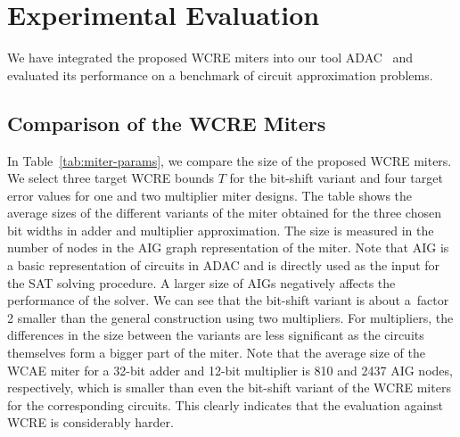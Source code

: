 \documentclass[runningheads]{llncs}
\begin{document}


\section{Experimental Evaluation}

We have integrated the proposed WCRE miters into our tool ADAC~\cite{ADAC} and
evaluated its performance on a benchmark of  circuit approximation problems.

\subsection{Comparison of the WCRE Miters}
%
In Table~\ref{tab:miter-params},  we compare the size of the proposed WCRE
miters. We select three target WCRE bounds $T$ for the bit-shift variant and
four target error values for one and two multiplier miter designs. The table
shows the average sizes of the different variants of the miter obtained for the
three chosen bit widths in adder and multiplier approximation. The size is
measured in the number of nodes in the AIG graph representation of the miter.
Note that AIG is a basic representation of circuits in ADAC and is directly used
as the input for the SAT solving procedure. A larger size of AIGs negatively
affects the performance of the solver. We can see that the bit-shift variant is
about a~factor 2 smaller than the general construction using two multipliers.
For multipliers, the differences in the size between the variants are less
significant as the circuits themselves form  a bigger part of the miter. Note
that the average size of the WCAE miter for a 32-bit adder and 12-bit multiplier
is 810 and 2437 AIG nodes, respectively, which is smaller than even the
bit-shift variant of the WCRE miters for the corresponding circuits. This
clearly indicates that the evaluation against WCRE is considerably harder.
\end{document}
